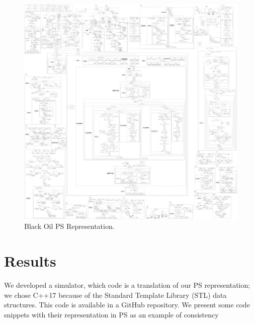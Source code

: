 \documentclass[review]{elsarticle}
\begin{document}
\newpage
{}
\begin{figure}
	\centering
	\includegraphics[width=1.0\textwidth]{Figures/Translated_PS.pdf}
	\caption{Black Oil PS Representation.}
	\label{fig:PS_Translated}
\end{figure}
\newpage
\restoregeometry
\section{Results}\label{sec:validation}
We developed a simulator, which code is a translation of our PS representation; we chose C++17 because of the Standard Template Library (STL) data structures. This code is available in a GitHub repository. We present some code snippets with their representation in PS as an example of consistency
\end{document}
